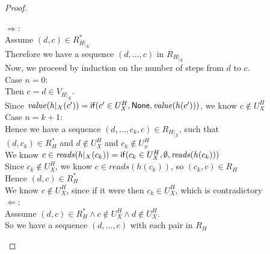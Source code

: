 \begin{proof}

\begin{tabbedproof}
\oo $\Rightarrow$: \\
\ooo Assume $(d,c) \in R^*_{H|_X}$ \\
\ooo Therefore we have a sequence $(d, \ldots, c)$ in $R_{H|_X}$ \\
\ooo Now, we proceed by induction on the number of steps from $d$ to $c$. \\
\ooo Case $n = 0$: \\
\oooo Then $c = d \in V_{H|_X}$.\\
\oooo Since $\mathit{value}(h|_{X}(c')) = \mathsf{if}({c' \in U^H_X}, {\mathsf{None}}, {\mathit{value}(h(c'))})$, we know $c \not\in U^H_X$ \\
\ooo Case $n = k+1$: \\
\oooo Hence we have a sequence $(d, \ldots, c_k, c) \in R_{H|_X}$, such that \\
\oooo $(d, c_k) \in R^*_H$ and $d \not \in U^H_X$ and $c_k \not \in U^H_x$ \\ 
\oooo We know $c \in \mathit{reads}(h|_X(c_k)) = \mathsf{if}({c_k \in U^H_X}, {\emptyset}, {\mathit{reads}(h(c_k))})$ \\
\oooo Since $c_k \not \in U^H_X$, we know $c \in \mathit{reads}(h(c_k))$, so $(c_k, c) \in R_H$ \\
\oooo Hence $(d, c) \in R^*_H$ \\
\oooo We know $c \not \in U^H_X$, since if it were then $c_k \in U^H_X$, which is contradictory \\
% 
\oo $\Leftarrow$: \\
\ooo Asssume $(d,c) \in R^*_H \land c \not\in U^H_X \land d \not\in U^H_X$. \\
\ooo So we have a sequence $(d, \ldots, c)$ with each pair in $R_H$ \\

\end{tabbedproof}
\end{proof}
